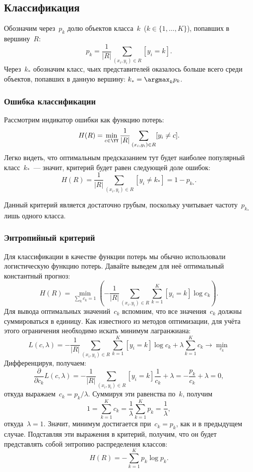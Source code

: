 \documentclass[12pt,a4paper]{article}
\begin{document}
\subsection{Классификация}
Обозначим через~$p_{k}$ долю объектов класса~$k$~($k \in \{1, \dots, K\}$), попавших в вершину~$R$:
\[
    p_{k}
    =
    \frac{1}{|R|}
    \sum_{(x_i, y_i) \in R}
        [y_i = k].
\]
Через~$k_*$ обозначим класс, чьих представителей оказалось больше всего среди объектов,
попавших в данную вершину: $k_* = \argmax_k p_{k}$.

\subsubsection{Ошибка классификации}
Рассмотрим индикатор ошибки как функцию потерь:
\[
    H(R)
    =
    \min_{c \in \YY}
    \frac{1}{|R|}
    \sum_{(x_i, y_i) \in R}
        [y_i \neq c].
\]
Легко видеть, что оптимальным предсказанием тут будет наиболее популярный класс~$k_*$~---
значит, критерий будет равен следующей доле ошибок:
\[
    H(R)
    =
    \frac{1}{|R|}
    \sum_{(x_i, y_i) \in R}
        [y_i \neq k_*]
    =
    1 - p_{k_*}.
\]

Данный критерий является достаточно грубым,
поскольку учитывает частоту~$p_{k_*}$ лишь одного класса.

\subsubsection{Энтропийный критерий}
Для классификации в качестве функции потерь мы обычно использовали логистическую функцию потерь. Давайте выведем для неё оптимальный константный прогноз:
\[
    H(R)
    =
    \min_{\sum_k c_k = 1} \left(
        -
        \frac{1}{|R|}
        \sum_{(x_i, y_i) \in R}
        \sum_{k = 1}^{K}
            [y_i = k]
            \log c_k
    \right).
\]
Для вывода оптимальных значений~$c_k$ вспомним, что все значения~$c_k$
должны суммироваться в единицу.
Как известного из методов оптимизации, для учёта этого ограничения необходимо искать
минимум лагранжиана:
\[
    L(c, \lambda)
    =
    -
    \frac{1}{|R|}
    \sum_{(x_i, y_i) \in R}
    \sum_{k = 1}^{K}
        [y_i = k]
        \log c_k
    +
    \lambda
    \sum_{k = 1}^{K}
        c_k
    \to
    \min_{c_k}
\]
Дифференцируя, получаем:
\[
    \frac{\partial}{\partial c_k}
    L(c, \lambda)
    =
    -
    \frac{1}{|R|}
    \sum_{(x_i, y_i) \in R}
        [y_i = k]
        \frac{1}{c_k}
    +
    \lambda
    =
    - \frac{p_k}{c_k}
    +
    \lambda
    =
    0,
\]
откуда выражаем~$c_k = p_k / \lambda$.
Суммируя эти равенства по~$k$, получим
\[
    1 = \sum_{k = 1}^{K} c_k = \frac{1}{\lambda} \sum_{k = 1}^{K} p_k = \frac{1}{\lambda},
\]
откуда~$\lambda = 1$.
Значит, минимум достигается при~$c_k = p_k$, как и в предыдущем случае.
Подставляя эти выражения в критерий, получим, что он будет представлять собой энтропию распределения классов:
\[
    H(R)
    =
    -
    \sum_{k = 1}^{K}
        p_k
        \log p_k.
\]
\end{document}
